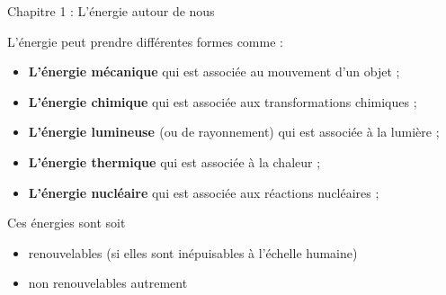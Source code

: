 \documentclass[24pt]{article}
\newcommand{\titre}{Chapitre 1 : L'énergie autour de nous} %
\begin{document}
\thispagestyle{fancy}
\cfoot{}

\begin{titlebox}{\titre}
    \setlength\parindent{4pt} %
    \setlength\parskip{5pt} 

    L’énergie peut prendre différentes formes comme :
    \begin{itemize}
        \item \textbf{\color{DarkRed} {L’énergie mécanique}} qui est associée au mouvement d’un objet ;
        \item \textbf{\color{DarkRed} {L’énergie chimique}} qui est associée aux transformations chimiques ;
        \item \textbf{\color{DarkRed} {L’énergie lumineuse }}(ou de rayonnement) qui est associée à la lumière ;
        \item \textbf{\color{DarkRed} {L’énergie thermique}} qui est associée à la chaleur ;
        \item \textbf{\color{DarkRed} {L’énergie nucléaire}} qui est associée aux réactions nucléaires ;
    \end{itemize}

    Ces énergies sont soit \begin{itemize}
        \item renouvelables (si elles sont inépuisables à l'échelle humaine)
        \item non renouvelables autrement
    \end{itemize}

    
    \vspace{50pt}

\end{titlebox}
\end{document}
